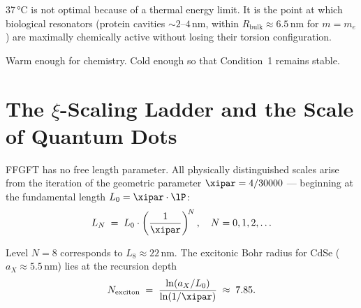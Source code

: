 \begin{foundation}
37\,°C is not optimal because of a thermal energy limit.
It is the point at which biological resonators
(protein cavities $\sim 2$--$4$\,nm, within
$R_{\text{bulk}} \approx 6.5$\,nm for $m = m_e$) are maximally
chemically active without losing their torsion configuration.

Warm enough for chemistry.
Cold enough so that Condition~1 remains stable.
\end{foundation}

\section{The \texorpdfstring{$\xi$}{xi}-Scaling Ladder and
  the Scale of Quantum Dots}
\label{sec:xi-ladder}

FFGFT has no free length parameter.
All physically distinguished scales arise from the
iteration of the geometric parameter $\xipar = 4/30000$
--- beginning at the fundamental length
$L_0 = \xipar \cdot \lP$:
\begin{equation}
  L_N \;=\; L_0 \cdot \left(\frac{1}{\xipar}\right)^{\!N},
  \quad N = 0, 1, 2, \ldots
\end{equation}

\begin{center}
\end{center}

Level $N = 8$ corresponds to $L_8 \approx 22$\,nm.
The excitonic Bohr radius for CdSe ($a_X \approx 5.5$\,nm)
lies at the recursion depth
\begin{equation}
  N_{\text{exciton}} \;=\;
  \frac{\ln(a_X / L_0)}{\ln(1/\xipar)} \;\approx\; 7.85.
\end{equation}

